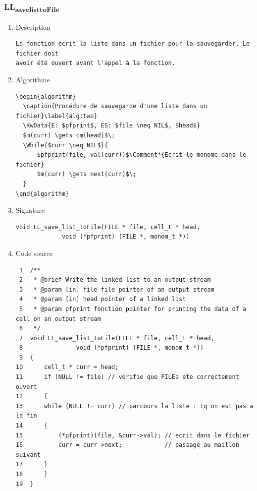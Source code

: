\documentclass[11pt]{article}
\begin{document}
\subsubsection{LL\textsubscript{save}\textsubscript{list}\textsubscript{toFile}}
\label{sec:org4476875}
\begin{enumerate}
\item Description
\label{sec:orgcbd7f8e}

\begin{verbatim}
La fonction écrit la liste dans un fichier pour la sauvegarder. Le fichier doit
avoir été ouvert avant l'appel à la fonction.
\end{verbatim}

\item Algorithme
\label{sec:org3feac2e}

\begin{verbatim}
\begin{algorithm}
  \caption{Procédure de sauvegarde d'une liste dans un fichier}\label{alg:two}
  \KwData{E: $pfprint$, ES: $file \neq NIL$, $head$}
  $m(curr) \gets cm(head)$\;
  \While{$curr \neq NIL$}{
      $pfprint(file, val(curr))$\Comment*{Ecrit le monome dans le fichier}
      $m(curr) \gets next(curr)$\;
  }
\end{algorithm}
\end{verbatim}

\item Signature
\label{sec:orgf90ea83}

\begin{verbatim}
void LL_save_list_toFile(FILE * file, cell_t * head,
			 void (*pfprint) (FILE *, monom_t *))
\end{verbatim}

\item Code source
\label{sec:org2cfc884}

\begin{verbatim}
 1  /**
 2   * @brief Write the linked list to an output stream
 3   * @param [in] file file pointer of an output stream
 4   * @param [in] head pointer of a linked list
 5   * @param pfprint fonction pointer for printing the data of a cell on an output stream
 6   */
 7  void LL_save_list_toFile(FILE * file, cell_t * head,
 8  			 void (*pfprint) (FILE *, monom_t *))
 9  {
10      cell_t * curr = head;
11      if (NULL != file) // verifie que FILEa ete correctement ouvert
12      {
13  	while (NULL != curr) // parcours la liste : tq on est pas a la fin
14  	{
15  	    (*pfprint)(file, &curr->val); // ecrit dans le fichier
16  	    curr = curr->next;            // passage au maillon suivant
17  	}	
18      }
19  }
\end{verbatim}


\end{enumerate}
\end{document}
